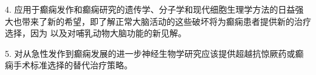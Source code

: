 4. 应用于癫痫发作和癫痫研究的遗传学、分子学和现代细胞生理学方法的日益强大也带来了新的希望，即了解正常大脑活动的这些破坏将为癫痫患者提供新的治疗选择，因为 以及对哺乳动物大脑功能的新见解。 

5. 对从急性发作到癫痫发展的进一步神经生物学研究应该提供超越抗惊厥药或癫痫手术标准选择的替代治疗策略。

